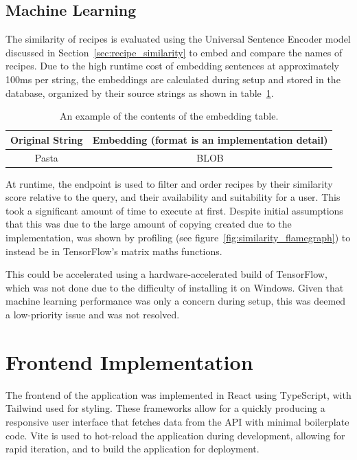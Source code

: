 \subsection{Machine Learning}
The similarity of recipes is evaluated using the Universal Sentence Encoder model discussed in Section~\ref{sec:recipe_similarity} to
embed and compare the names of recipes. Due to the high runtime cost of embedding sentences at approximately 100ms per string,
the embeddings are calculated during setup and stored in the database, organized by their source strings as shown in table~\ref{fig:embedding_table}.

\begin{table}[h]
    \centering
    \caption{\label{fig:embedding_table}An example of the contents of the embedding table.}
    \begin{tabular}{cc}
        \toprule
        \textbf{Original String} & \textbf{Embedding (format is an implementation detail)} \\\midrule
        Pasta & BLOB \\\bottomrule
    \end{tabular}
\end{table}

At runtime, the  endpoint is used to filter and order recipes by their similarity score
relative to the query, and their availability and suitability for a user.
This took a significant amount of time to execute at first. Despite initial assumptions that this was due to the large amount of copying
created due to the implementation, was shown by profiling (see figure~\ref{fig:similarity_flamegraph}) to instead be in TensorFlow's
matrix maths functions.

This could be accelerated using a hardware-accelerated build of TensorFlow, which was not done due to the difficulty of installing
it on Windows. Given that machine learning performance was only a concern during setup, this was deemed a low-priority
issue and was not resolved.

\section{Frontend Implementation}

The frontend of the application was implemented in React using TypeScript, with Tailwind used for styling. These
frameworks allow for a quickly producing a responsive user interface that fetches data from the API with minimal
boilerplate code. Vite is used to hot-reload the application during development, allowing for rapid iteration, and
to build the application for deployment.

